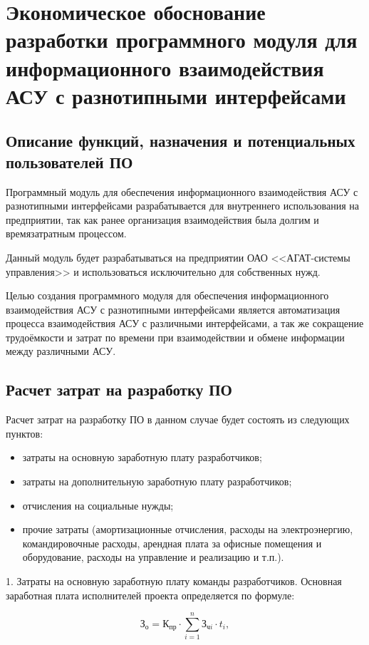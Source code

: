\section{Экономическое обоснование разработки программного модуля для информационного взаимодействия АСУ с разнотипными интерфейсами}
\label{sec:economics}

\subsection{Описание функций, назначения и потенциальных пользователей ПО}

Программный модуль для обеспечения информационного взаимодействия АСУ с разнотипными интерфейсами разрабатывается для внутреннего использования на предприятии, так как ранее организация взаимодействия была долгим и времязатратным процессом. 

Данный модуль будет разрабатываться на предприятии ОАО <<АГАТ-системы управления>> и использоваться исключительно для собственных нужд. 

Целью создания программного модуля для обеспечения информационного взаимодействия АСУ с разнотипными интерфейсами является автоматизация процесса взаимодействия АСУ с различными интерфейсами, а так же сокращение трудоёмкости и затрат по времени при взаимодействии и обмене информации между различными АСУ.

\subsection{Расчет затрат на разработку ПО}
Расчет затрат на разработку ПО в данном случае будет состоять из следующих пунктов:
\begin{itemize}
    \item затраты на основную заработную плату разработчиков;
    \item затраты на дополнительную заработную плату разработчиков;
    \item отчисления на социальные нужды;
    \item прочие затраты (амортизационные отчисления, расходы на электроэнергию, командировочные расходы, арендная плата за офисные помещения и оборудование, расходы на управление и реализацию и т.п.).
\end{itemize}

1. Затраты на основную заработную плату команды разработчиков.
Основная заработная плата исполнителей проекта определяется по формуле:

\begin{equation}
    \mbox{З}_{\mbox{о}}=\mbox{К}_{\mbox{пр}}\cdot \sum_{i=1}^{n}{\mbox{З}_{\mbox{ч}i}\cdot t_{i}},
\end{equation}


